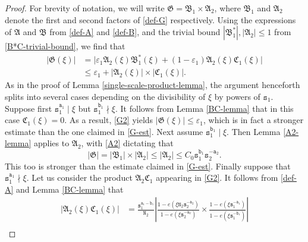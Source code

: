 \documentclass[12pt, twoside]{article}
\theoremstyle{definition}
\numberwithin{equation}{section}
\begin{document}
\begin{proof} 
For brevity of notation, we will write $\mathfrak G = \mathfrak B_1 \times \mathfrak A_2$, where $\mathfrak B_1$ and $\mathfrak A_2$ denote the first and second factors of \eqref{def-G} respectively. Using the expressions of $\mathfrak A$ and $\mathfrak B$ from \eqref{def-A} and \eqref{def-B}, and the trivial bound $|\mathfrak B_1^{\ast}|, |\mathfrak A_2| \leq 1$ from \eqref{B*C-trivial-bound},  we find that
\begin{align}
|\mathfrak G(\xi)| &= \bigl| \varepsilon_1 \mathfrak A_2(\xi) \mathfrak B_1^{\ast}(\xi) + (1 - \varepsilon_1) \mathfrak A_2(\xi) \mathfrak C_1(\xi) \bigr| \nonumber \\ 
&\leq \varepsilon_1 + |\mathfrak A_2(\xi)| \times |\mathfrak C_1(\xi)|. \label{G2}
\end{align}  
As in the proof of Lemma \ref{single-scale-product-lemma}, the argument henceforth splits into several cases depending on the divisibility of $\xi$ by powers of $\mathtt s_1$. 
\vskip0.1in 
 Suppose first $\mathtt s_1^{\mathtt a_1} \mid \xi$ but $\mathtt s_1^{\mathtt b_1} \nmid \xi$. It follows from Lemma \ref{BC-lemma} that in this case $\mathfrak C_1(\xi) = 0$. As a result, \eqref{G2} yields $|\mathfrak G(\xi)| \leq \varepsilon_1$, which is in fact a stronger estimate than the one claimed in \eqref{G-est}. 
\vskip0.1in
 Next assume $\mathtt s_1^{\mathtt b_1} \mid \xi$. Then Lemma \ref{A2-lemma} applies to $\mathfrak A_2$, with \eqref{A2} dictating that 
\[ |\mathfrak G| = |\mathfrak B_1| \times |\mathfrak A_2| \leq |\mathfrak A_2| \leq C_0 \mathtt s_1^{\mathtt b_1} \mathtt s_2^{-\mathtt a_2}. \]
This too is stronger than the estimate claimed in \eqref{G-est}.   
\vskip0.1in
 Finally suppose that $\mathtt s_1^{\mathtt a_1} \nmid \xi$. Let us consider the product $\mathfrak A_2 \mathfrak C_1$ appearing in \eqref{G2}. It follows from \eqref{def-A} and Lemma \ref{BC-lemma} that 
\begin{align}  |\mathfrak A_2(\xi) \mathfrak C_1(\xi)| &= \frac{\mathtt s_1^{\mathtt a_1-\mathtt b_1}}{\mathtt N_2} \left| \frac{1 - e(\xi \mathtt N_2 \mathtt s_2^{-\mathtt a_2})}{1 - e(\xi \mathtt s_2^{-\mathtt a_2})} \times \frac{1 - e(\xi \mathtt s_1^{-\mathtt a_1})}{1 - e(\xi \mathtt s_1^{-\mathtt b_1})} \right| \nonumber \\ 

\end{align}
\end{proof}
\end{document}
